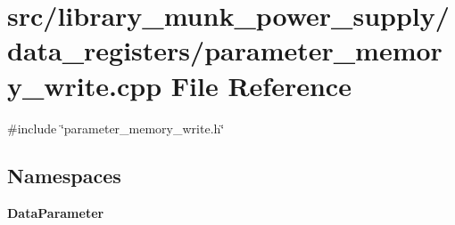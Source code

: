\section{src/library\+\_\+munk\+\_\+power\+\_\+supply/data\+\_\+registers/parameter\+\_\+memory\+\_\+write.cpp File Reference}
\label{parameter__memory__write_8cpp}
{\ttfamily \#include \char`\"{}parameter\+\_\+memory\+\_\+write.\+h\char`\"{}}\newline
\subsection*{Namespaces}
\begin{DoxyCompactItemize}
\item 
 \textbf{ Data\+Parameter}
\end{DoxyCompactItemize}
